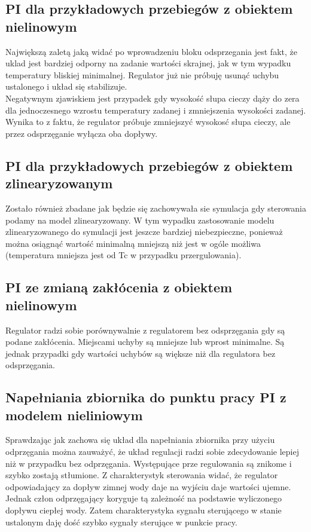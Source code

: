 \subsection{PI dla przykładowych przebiegów z obiektem nielinowym}
\indent Największą zaletą jaką widać po wprowadzeniu bloku odsprzegania jest fakt, że uklad jest bardziej odporny na zadanie wartości skrajnej, jak w tym wypadku temperatury bliskiej minimalnej. Regulator już nie próbuję usunąć uchybu ustalonego i układ się stabilizuje.  \\
\indent Negatywnym zjawiskiem jest przypadek gdy wysokość słupa cieczy dąży do zera dla jednoczesnego wzrostu temperatury zadanej i zmniejszenia wysokości zadanej. Wynika to z faktu, że regulator próbuje zmniejszyć wysokosć słupa cieczy, ale przez odsprzęganie wyłącza oba dopływy.
%     


\subsection{PI dla przykładowych przebiegów z obiektem zlinearyzowanym}
\indent Zostało również zbadane jak będzie się zachowywała sie symulacja gdy sterowania podamy na model zlinearyzowany. W tym wypadku zastosowanie modelu zlinearyzowanego do symulacji jest jeszcze bardziej niebezpieczne, ponieważ można osiągnąć wartość minimalną mniejszą niż jest w ogóle możliwa (temperatura mniejsza  jest od Tc w przypadku przergulowania).
\FloatBarrier
    
\FloatBarrier


\subsection{PI ze zmianą zakłócenia z obiektem nielinowym}
\indent Regulator radzi sobie porównywalnie z regulatorem bez odsprzęgania gdy są podane zakłócenia. Miejscami uchyby są mniejsze lub wprost minimalne. Są jednak przypadki gdy wartości uchybów są większe niż dla regulatora bez odsprzęgania.
\FloatBarrier
    
\FloatBarrier

\subsection{Napełniania zbiornika do punktu pracy PI z modelem nieliniowym}
\indent Sprawdzając jak zachowa się układ dla napełniania zbiornika przy użyciu odprzęgania można zauważyć, że układ regulacji radzi sobie zdecydowanie lepiej niż w przypadku bez odprzęgania. Występujące prze regulowania są znikome i szybko zostają stłumione. Z charakterystyk sterowania widać, że regulator odpowiadający za dopływ zimnej wody daje na wyjściu daje wartości ujemne. Jednak człon odprzęgający koryguje tą zależność na podstawie wyliczonego dopływu ciepłej wody. Zatem charakterystyka sygnału sterującego w stanie ustalonym daję dość szybko sygnały sterujące w punkcie pracy.
\FloatBarrier
    
\FloatBarrier